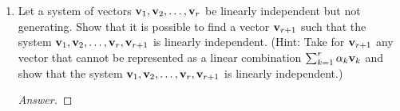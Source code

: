 \documentclass[../psets.tex]{subfiles}
\begin{document}
\begin{enumerate}[label={\textbf{2.\arabic*.}}]
\begin{enumerate}
\begin{proof}
        \end{proof}
        \item Subsets of linearly independent sets are linearly independent.
        \begin{proof}
            True.\par
            Suppose for the sake of contradiction that there exists a linearly dependent subset of a linearly independent list. Then there are nonzero coefficients that make a linear combination of the linearly dependent equal to zero. Thus, if we pair these coefficients to their respective vectors in a sum of the whole list, and use zero everywhere else, we will have a set of coefficients, not all zero, that make the supposedly linearly independent list sum to zero, a contradiction.
        \end{proof}
        \item If $\alpha_1\vm_1+\alpha_2\vm_2+\cdots+\alpha_n\vm_n=\mathbf{0}$, then all scalars $\alpha_k$ are zero.
        \begin{proof}[Answer]
            False.\par
            Let $\vm_1,\vm_2$ be defined by
            \begin{align*}
                \vm_1 &=
                \begin{pmatrix}
                    1\\
                    0\\
                \end{pmatrix}&
                \vm_2 &=
                \begin{pmatrix}
                    -1\\
                    0\\
                \end{pmatrix}
            \end{align*}
            Then $1\vm_1+1\vm_2=\bm{0}$.
        \end{proof}
    \end{enumerate}
    \setcounter{enumi}{4}
    \item Let a system of vectors $\mathbf{v}_1,\mathbf{v}_2,\dots,\mathbf{v}_r$ be linearly independent but not generating. Show that it is possible to find a vector $\mathbf{v}_{r+1}$ such that the system $\mathbf{v}_1,\mathbf{v}_2,\dots,\mathbf{v}_r,\mathbf{v}_{r+1}$ is linearly independent. (Hint: Take for $\mathbf{v}_{r+1}$ any vector that cannot be represented as a linear combination $\sum_{k=1}^r\alpha_k\mathbf{v}_k$ and show that the system $\mathbf{v}_1,\mathbf{v}_2,\dots,\mathbf{v}_r,\mathbf{v}_{r+1}$ is linearly independent.)
    \begin{proof}[Answer]

\end{proof}
\end{enumerate}
\end{document}
